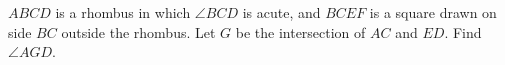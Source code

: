 $ABCD$ is a rhombus in which $\angle BCD$ is acute, and $BCEF$ is a square drawn on side $BC$ outside the rhombus. Let $G$ be the intersection of $AC$ and $ED$. Find $\angle AGD$.
